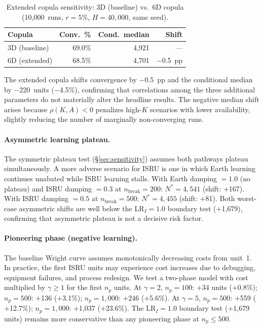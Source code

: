 \documentclass[preprint,12pt]{elsarticle}
\begin{document}
\begin{table}[htbp]
\centering
\caption{Extended copula sensitivity: 3D (baseline) vs.\ 6D copula (10{,}000~runs, $r = 5\%$, $H = 40{,}000$, same seed).}
\label{tab:copula_6d}
\small
\begin{tabular}{@{}lrrr@{}}
\toprule
Copula & Conv.\ \% & Cond.\ median & Shift \\
\midrule
3D (baseline) & 69.0\% & 4{,}921 & --- \\
6D (extended) & 68.5\% & 4{,}701 & $-$0.5~pp \\
\bottomrule
\end{tabular}
\end{table}

The extended copula shifts convergence by $-$0.5~pp and the conditional median by $-$220~units ($-$4.5\%), confirming that correlations among the three additional parameters do not materially alter the headline results. The negative median shift arises because $\rho(K, A) < 0$ penalizes high-$K$ scenarios with lower availability, slightly reducing the number of marginally non-converging runs.

\paragraph{Asymmetric learning plateau.} The symmetric plateau test (\S\ref{sec:sensitivity}) assumes both pathways plateau simultaneously. A more adverse scenario for ISRU is one in which Earth learning continues unabated while ISRU learning stalls. With Earth damping $= 1.0$ (no plateau) and ISRU damping $= 0.3$ at $n_{\mathrm{break}} = 200$: $N^* = 4{,}541$ (shift: $+$167). With ISRU damping $= 0.5$ at $n_{\mathrm{break}} = 500$: $N^* = 4{,}455$ (shift: $+$81). Both worst-case asymmetric shifts are well below the $\mathrm{LR}_I = 1.0$ boundary test ($+$1{,}679), confirming that asymmetric plateau is not a decisive risk factor.

\paragraph{Pioneering phase (negative learning).} The baseline Wright curve assumes monotonically decreasing costs from unit~1. In practice, the first ISRU units may experience cost increases due to debugging, equipment failures, and process redesign. We test a two-phase model with cost multiplied by $\gamma \geq 1$ for the first $n_p$ units. At $\gamma = 2$, $n_p = 100$: $+$34 units ($+$0.8\%); $n_p = 500$: $+$136 ($+$3.1\%); $n_p = 1{,}000$: $+$246 ($+$5.6\%). At $\gamma = 5$, $n_p = 500$: $+$559 ($+$12.7\%); $n_p = 1{,}000$: $+$1{,}037 ($+$23.6\%). The $\mathrm{LR}_I = 1.0$ boundary test ($+$1{,}679 units) remains more conservative than any pioneering phase at $n_p \leq 500$.
\end{document}
